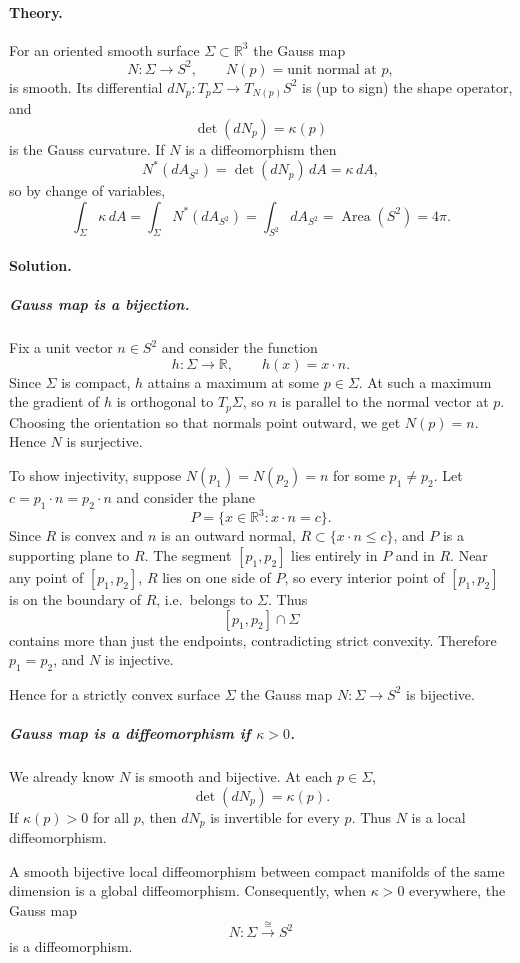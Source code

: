 \documentclass[12pt,a4paper]{article}
\theoremstyle{plain}
\theoremstyle{definition}      %
\begin{document}
\paragraph{Theory.}
For an oriented smooth surface $\Sigma\subset\mathbb{R}^3$ the Gauss map
\[
N:\Sigma\to S^2,\qquad N(p)=\text{unit normal at }p,
\]
is smooth.  Its differential
$dN_p:T_p\Sigma\to T_{N(p)}S^2$ is (up to sign) the shape operator, and
\[
\det(dN_p)=\kappa(p)
\]
is the Gauss curvature.  If $N$ is a diffeomorphism then
\[
N^*(dA_{S^2}) = \det(dN_p)\,dA = \kappa\, dA,
\]
so by change of variables,
\[
\int_\Sigma \kappa\,dA
= \int_\Sigma N^*(dA_{S^2})
= \int_{S^2} dA_{S^2}
= \operatorname{Area}(S^2) = 4\pi.
\]

\paragraph{Solution.}

\subparagraph{Gauss map is a bijection.}
Fix a unit vector $n\in S^2$ and consider the function
\[
h:\Sigma\to\mathbb{R},\qquad h(x)=x\cdot n.
\]
Since $\Sigma$ is compact, $h$ attains a maximum at some $p\in\Sigma$.
At such a maximum the gradient of $h$ is orthogonal to $T_p\Sigma$, so $n$
is parallel to the normal vector at $p$.  Choosing the orientation so that
normals point outward, we get $N(p)=n$.  Hence $N$ is surjective.

To show injectivity, suppose $N(p_1)=N(p_2)=n$ for some $p_1\neq p_2$.
Let $c=p_1\cdot n=p_2\cdot n$ and consider the plane
\[
P=\{x\in\mathbb{R}^3 : x\cdot n = c\}.
\]
Since $R$ is convex and $n$ is an outward normal, $R\subset\{x\cdot n\le c\}$,
and $P$ is a supporting plane to $R$.  The segment $[p_1,p_2]$ lies entirely
in $P$ and in $R$.  Near any point of $[p_1,p_2]$, $R$ lies on one side
of $P$, so every interior point of $[p_1,p_2]$ is on the boundary of $R$,
i.e.\ belongs to $\Sigma$.  Thus
\[
[p_1,p_2]\cap\Sigma
\]
contains more than just the endpoints, contradicting strict convexity.
Therefore $p_1=p_2$, and $N$ is injective.

Hence for a strictly convex surface $\Sigma$ the Gauss map
$N:\Sigma\to S^2$ is bijective.

\subparagraph{Gauss map is a diffeomorphism if $\kappa>0$.}
We already know $N$ is smooth and bijective.  At each $p\in\Sigma$,
\[
\det(dN_p)=\kappa(p).
\]
If $\kappa(p)>0$ for all $p$, then $dN_p$ is invertible for every $p$.
Thus $N$ is a local diffeomorphism.

A smooth bijective local diffeomorphism between compact manifolds of the
same dimension is a global diffeomorphism.  Consequently, when
$\kappa>0$ everywhere, the Gauss map
\[
N:\Sigma\stackrel{\cong}{\longrightarrow} S^2
\]
is a diffeomorphism.
\end{document}
